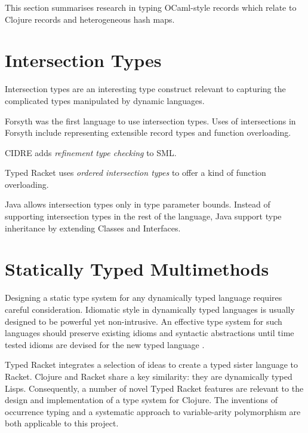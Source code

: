 This section summarises research in typing OCaml-style records
which relate to Clojure records and heterogeneous hash maps.

\section{Intersection Types}

Intersection types are an interesting type construct relevant to capturing the complicated
types manipulated by dynamic languages.

Forsyth\cite{Rey96} was the first language to use intersection types.
Uses of intersections in Forsyth include representing extensible record types
and function overloading.

CIDRE\cite{Dav05} adds \emph{refinement type checking} to SML.

Typed Racket uses \emph{ordered intersection types} to offer a kind of function overloading.

Java allows intersection types only in type parameter bounds. Instead of supporting intersection
types in the rest of the language, Java support type inheritance by extending Classes and Interfaces.

\section{Statically Typed Multimethods}







Designing a static type system for any dynamically typed language requires
careful consideration. Idiomatic style in dynamically typed languages is usually
designed to be powerful yet non-intrusive. An effective type system
for such languages should preserve existing idioms and syntactic abstractions
until time tested idioms are devised for the new typed language \cite{Tob10}.

Typed Racket \cite{Tob10} integrates a selection of ideas to
create a typed sister language to Racket.
Clojure and Racket share a key similarity: they are dynamically typed Lisps.
Consequently, a number of novel Typed Racket features are relevant to the design and implementation
of a type system for Clojure.
The inventions of occurrence typing \cite{TF10}
and a systematic approach to variable-arity polymorphism
\cite{STF09}
are both applicable to this project.

